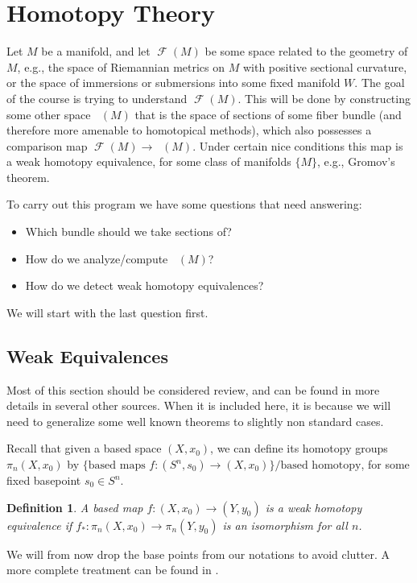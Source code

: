 \documentclass{article}
\newtheorem{definition}[theorem]{Definition}
\newtheorem{proposed work}[theorem]{Proposed Work}
\theoremstyle{definition}
\DeclareMathOperator{\CF}{\mathcal F}
\DeclareMathOperator{\CFh}{\mathcal{F}^{h}} %
\begin{document}
\section{Homotopy Theory}
Let $M$ be a manifold, and let $\CF(M)$ be some space related to the geometry of $M$, e.g., the space of Riemannian metrics on $M$ with positive sectional curvature, or the space of immersions or submersions into some fixed manifold $W$. The goal of the course is trying to understand $\CF(M)$. This will be done by constructing some other space $\CFh(M)$ that is the space of sections of some fiber bundle (and therefore more amenable to homotopical methods), which also possesses a comparison map $\CF(M)\to \CFh(M)$. Under certain nice conditions this map is a weak homotopy equivalence, for some class of manifolds $\{M\}$, e.g., Gromov's theorem.

To carry out this program we have some questions that need answering:
\begin{itemize}
\item Which bundle should we take sections of?
\item How do we analyze/compute $\CFh(M)$?
\item How do we detect weak homotopy equivalences? 
\end{itemize} 
We will start with the last question first.

\subsection{Weak Equivalences}
Most of this section should be considered review, and can be found in more details in several other sources. When it is included here, it is because we will need to generalize some well known theorems to slightly non standard cases.

Recall that given a based space $(X,x_0)$, we can define its homotopy groups $\pi_n(X,x_0)$ by $\{\text{based maps }f:(S^n,s_0)\to (X,x_0)\}/\text{based homotopy}$, for some fixed basepoint $s_0\in S^n$. 
\begin{definition}
A based map $f:(X,x_0)\to (Y,y_0)$ is a weak homotopy equivalence if $f_*:\pi_n(X,x_0)\to \pi_n(Y,y_0)$ is an isomorphism for all $n$.
\end{definition}
We will from now drop the base points from our notations to avoid clutter. A more complete treatment can be found in \cite{may1999concise}.
\end{document}

